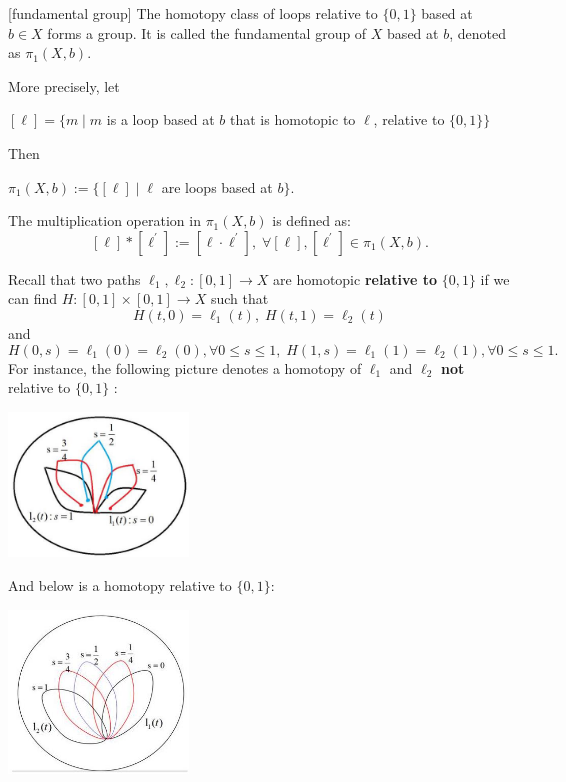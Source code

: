 \begin{definition} \label{def:fund_group} [fundamental group] The homotopy class of loops relative to \(\{ 0,1\}\) based at \(b \in  X\) forms a group. It is called the fundamental group of \(X\) based at \(b\), denoted as \({\pi }_{1}\left( {X,b}\right)\).

More precisely, let
\begin{center}
\(\left\lbrack  \ell \right\rbrack   = \{ m \mid  m\) is a loop based at \(b\) that is homotopic to \(\ell\), relative to \(\{ 0,1\} \}\)\end{center}
Then 
\begin{center} \({\pi }_{1}\left( {X,b}\right)  := \{ \left\lbrack  \ell \right\rbrack   \mid  \ell\) are loops based at \(b\}\).\end{center} 
The multiplication operation in \({\pi }_{1}\left( {X,b}\right)\) is defined as:
\[
\left\lbrack  \ell \right\rbrack   * \left\lbrack  {\ell }^{\prime }\right\rbrack   \mathrel{\text{ := }} \left\lbrack  {\ell  \cdot  {\ell }^{\prime }}\right\rbrack ,\;\forall \left\lbrack  \ell \right\rbrack ,\left\lbrack  {\ell }^{\prime }\right\rbrack   \in  {\pi }_{1}\left( {X,b}\right).
\]
\end{definition}

Recall that two paths \({\ell }_{1},{\ell }_{2} : \left\lbrack  {0,1}\right\rbrack   \rightarrow  X\) are homotopic {\bf relative to} \(\{ 0,1\}\) if we can find \(H : \left\lbrack  {0,1}\right\rbrack   \times  \left\lbrack  {0,1}\right\rbrack   \rightarrow  X\) such that
\[
H\left( {t,0}\right)  = {\ell }_{1}\left( t\right),\;H\left( {t,1}\right)  = {\ell }_{2}\left( t\right)
\]
and
\[
H\left( {0,s}\right)  = {\ell }_{1}\left( 0\right)  = {\ell }_{2}\left( 0\right),\forall 0 \leq  s \leq  1,\;H\left( {1,s}\right)  = {\ell }_{1}\left( 1\right)  = {\ell }_{2}\left( 1\right),\forall 0 \leq  s \leq  1.
\]
For instance, the following picture denotes a homotopy of $\ell_1$ and $\ell_2$ {\bf not} relative to \(\{ 0,1\}\) :
\begin{center}
\includegraphics[width=0.36\textwidth]{images/Ch7_not_relative_boundary.jpg}
\end{center}
And below is a homotopy relative to \(\{ 0,1\}\):
\begin{center}
\includegraphics[width=0.36\textwidth]{images/Ch7_relative_boundary.jpg}
\end{center}

